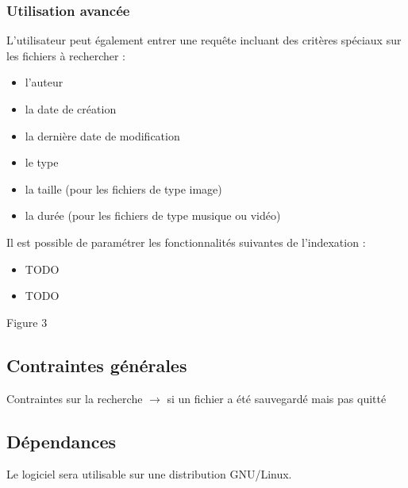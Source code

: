 \documentclass[a4paper,10pt]{article}
\begin{document}
\subsubsection{Utilisation avancée}
L'utilisateur peut également entrer une requête incluant des critères spéciaux
sur les fichiers à rechercher :
\begin{itemize}
 \item l'auteur
 \item la date de création
 \item la dernière date de modification
 \item le type
 \item la taille (pour les fichiers de type image)
 \item la durée (pour les fichiers de type musique ou vidéo)
\end{itemize}
Il est possible de paramétrer les fonctionnalités suivantes de l'indexation :
\begin{itemize}
 \item TODO
 \item TODO
\end{itemize}

Figure 3

\subsection{Contraintes générales}
Contraintes sur la recherche $\rightarrow$ si un fichier a été sauvegardé mais
pas quitté

\subsection{Dépendances}
Le logiciel sera utilisable sur une distribution GNU/Linux.
\end{document}
